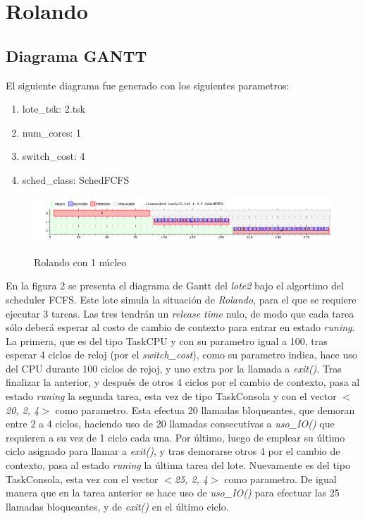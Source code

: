 \section{Rolando}

\subsection{Diagrama GANTT}

El siguiente diagrama fue generado con los siguientes parametros:

\begin{enumerate}
	\item lote\_tsk: 2.tsk
	\item num\_cores: 1
	\item switch\_cost: 4
	\item sched\_class: SchedFCFS
\end{enumerate}

\begin{figure}[h]
    \includegraphics[width=\linewidth]{images/2_1nucleo.png}
    \label{fig:Task Consola}
    \caption{Rolando con 1 núcleo}
\end{figure}

En la figura 2 se presenta el diagrama de Gantt del \textit{lote2} bajo el algortimo del scheduler FCFS. Este lote simula la situaci\'on de \textit{Rolando}, para el que se requiere ejecutar 3 tareas. Las tres tendr\'an un \textit{release time} nulo, de modo que cada tarea s\'olo deber\'a esperar al costo de cambio de contexto para entrar en estado \textit{runing}. La primera, que es del tipo TaskCPU y con su parametro igual a 100, tras esperar 4 ciclos de reloj (por el \textit{switch\_cost}), como su parametro indica, hace uso del CPU durante 100 ciclos de rejoj, y uno extra por la llamada a \textit{exit()}. Tras finalizar la anterior, y despu\'es de otros 4 ciclos por el cambio de contexto, pasa al estado \textit{runing} la segunda tarea, esta vez de tipo TaskConsola y con el vector \textit{$<$20, 2, 4$>$} como parametro. Esta efectua 20 llamadas bloqueantes, que demoran entre 2 a 4 ciclos, haciendo uso de 20 llamadas consecutivas a \textit{uso\_IO()} que requieren a su vez de 1 ciclo cada una. Por \'ultimo, luego de emplear su \'ultimo ciclo asignado para llamar a \textit{exit()}, y tras demorarse otros 4 por el cambio de contexto, pasa al estado \textit{runing} la \'ultima tarea del lote. Nuevamente es del tipo TaskConsola, esta vez con el vector \textit{$<$25, 2, 4$>$} como parametro. De igual manera que en la tarea anterior se hace uso de \textit{uso\_IO()} para efectuar las 25 llamadas bloqueantes, y de \textit{exit()} en el \'ultimo ciclo.

